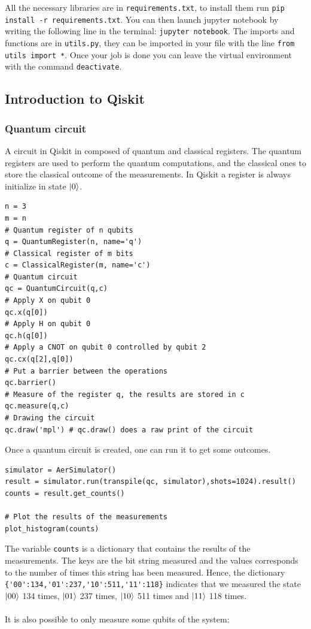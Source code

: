 \documentclass{article}
\begin{document}
All the necessary libraries are in \verb|requirements.txt|, to install them run \verb|pip install -r requirements.txt|. You can then launch jupyter notebook by writing the following line in the terminal: \verb|jupyter notebook|. The imports and functions are in \verb|utils.py|, they can be imported in your file with the line \verb|from utils import *|. Once your job is done you can leave the virtual environment with the command \verb|deactivate|.

\subsection{Introduction to Qiskit}

\subsubsection{Quantum circuit}

A circuit in Qiskit in composed of quantum and classical registers. The quantum registers are used to perform the quantum computations, and the classical ones to store the classical outcome of the measurements. In Qiskit a register is always initialize in state $\ket{0}$.

\begin{verbatim}
n = 3
m = n
# Quantum register of n qubits
q = QuantumRegister(n, name='q')
# Classical register of m bits
c = ClassicalRegister(m, name='c')
# Quantum circuit
qc = QuantumCircuit(q,c)
# Apply X on qubit 0
qc.x(q[0])
# Apply H on qubit 0
qc.h(q[0])
# Apply a CNOT on qubit 0 controlled by qubit 2
qc.cx(q[2],q[0])
# Put a barrier between the operations
qc.barrier()
# Measure of the register q, the results are stored in c
qc.measure(q,c)
# Drawing the circuit
qc.draw('mpl') # qc.draw() does a raw print of the circuit
\end{verbatim}
Once a quantum circuit is created, one can run it to get some outcomes.

\begin{verbatim}
simulator = AerSimulator()
result = simulator.run(transpile(qc, simulator),shots=1024).result()
counts = result.get_counts()

# Plot the results of the measurements
plot_histogram(counts)
\end{verbatim}
The variable \verb|counts| is a dictionary that contains the results of the measurements. The keys are the bit string measured and the values corresponds to the number of times this string has been measured. Hence, the dictionary \verb|{'00':134,'01':237,'10':511,'11':118}| indicates that we measured the state $\ket{00}$ 134 times, $\ket{01}$ 237 times, $\ket{10}$ 511 times and $\ket{11}$ 118 times. \\\\ It is also possible to only measure some qubits of the system:
\end{document}
